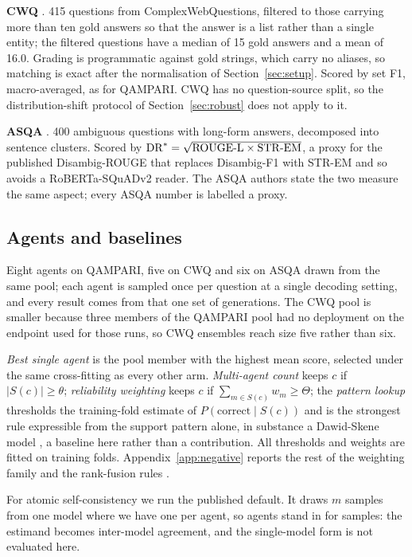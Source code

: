 \documentclass[11pt]{article}
\begin{document}
\textbf{CWQ} \citep{talmor2018web}. 415 questions from ComplexWebQuestions, filtered to those carrying more than ten gold answers so that the answer is a list rather than a single entity; the filtered questions have a median of 15 gold answers and a mean of 16.0. Grading is programmatic against gold strings, which carry no aliases, so matching is exact after the normalisation of Section~\ref{sec:setup}. Scored by set F1, macro-averaged, as for QAMPARI. CWQ has no question-source split, so the distribution-shift protocol of Section~\ref{sec:robust} does not apply to it.

\textbf{ASQA} \citep{stelmakh2022asqa}. 400 ambiguous questions with long-form answers, decomposed into sentence clusters. Scored by $\mathrm{DR}^* = \sqrt{\mathrm{ROUGE\text-L} \times \mathrm{STR\text-EM}}$, a proxy for the published Disambig-ROUGE that replaces Disambig-F1 with STR-EM and so avoids a RoBERTa-SQuADv2 reader. The ASQA authors state the two measure the same aspect; every ASQA number is labelled a proxy.

\subsection{Agents and baselines}

Eight agents on QAMPARI, five on CWQ and six on ASQA drawn from the same pool; each agent is sampled once per question at a single decoding setting, and every result comes from that one set of generations. The CWQ pool is smaller because three members of the QAMPARI pool had no deployment on the endpoint used for those runs, so CWQ ensembles reach size five rather than six.

\emph{Best single agent} is the pool member with the highest mean score, selected under the same cross-fitting as every other arm. \emph{Multi-agent count} keeps $c$ if $|S(c)| \geq \theta$; \emph{reliability weighting} keeps $c$ if $\sum_{m \in S(c)} w_m \geq \Theta$; the \emph{pattern lookup} thresholds the training-fold estimate of $P(\mathrm{correct} \mid S(c))$ and is the strongest rule expressible from the support pattern alone, in substance a Dawid-Skene model \citep{dawid1979maximum}, a baseline here rather than a contribution. All thresholds and weights are fitted on training folds. Appendix~\ref{app:negative} reports the rest of the weighting family and the rank-fusion rules \citep{cormack2009reciprocal}.

For atomic self-consistency \citep{thirukovalluru2024atomic} we run the published default. It draws $m$ samples from one model where we have one per agent, so agents stand in for samples: the estimand becomes inter-model agreement, and the single-model form is not evaluated here.
\end{document}
